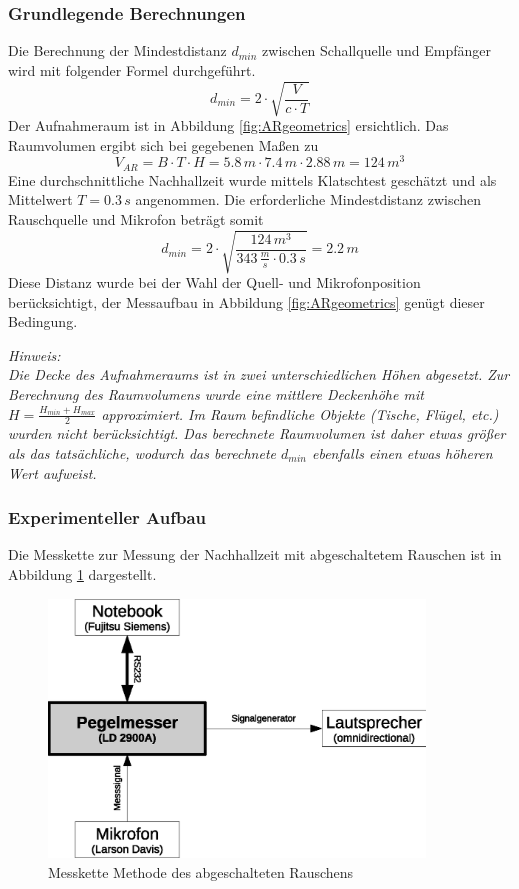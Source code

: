 \documentclass[11pt]{report}
\begin{document}
\subsubsection{Grundlegende Berechnungen}
Die Berechnung der Mindestdistanz $d_{min}$ zwischen Schallquelle und Empf\"anger wird mit folgender Formel durchgef\"uhrt.
\begin{equation}
d_{min}=2\cdot \sqrt{\frac{V}{c\cdot T}}
\label{eq:dmin}
\end{equation}
Der Aufnahmeraum ist in Abbildung \ref{fig:ARgeometrics} ersichtlich. Das Raumvolumen ergibt sich bei gegebenen Ma\ss en zu 
\begin{equation}
V_{AR} = B\cdot T\cdot H = 5.8\,m\cdot 7.4\,m\cdot 2.88\,m = 124\,m^{3}
\end{equation}
Eine durchschnittliche Nachhallzeit wurde mittels Klatschtest gesch\"atzt und als Mittelwert $T=0.3\,s$ angenommen. Die erforderliche Mindestdistanz zwischen Rauschquelle und Mikrofon betr\"agt somit
\begin{equation}
d_{min}=2\cdot \sqrt{\frac{124\,m^{3}}{343\,\frac{m}{s}\cdot 0.3\,s}} = 2.2\,m
\end{equation}
Diese Distanz wurde bei der Wahl der Quell- und Mikrofonposition ber\"ucksichtigt, der Messaufbau in Abbildung \ref{fig:ARgeometrics} gen\"ugt dieser Bedingung.
\begin{leftbar}
\textit{ Hinweis:\\
Die Decke des Aufnahmeraums ist in zwei unterschiedlichen H\"ohen abgesetzt. Zur Berechnung des Raumvolumens wurde eine mittlere Deckenh\"ohe mit $H=\frac{H_{min}+H_{max}}{2}$ approximiert. Im Raum befindliche Objekte (Tische, Fl\"ugel, etc.) wurden nicht ber\"ucksichtigt. Das berechnete Raumvolumen ist daher etwas gr\"o\ss er als das tats\"achliche, wodurch das berechnete $d_{min}$ ebenfalls einen etwas h\"oheren Wert aufweist.} 
\end{leftbar}
\subsubsection{Experimenteller Aufbau}
Die Messkette zur Messung der Nachhallzeit mit abgeschaltetem Rauschen ist in Abbildung \ref{fig:rauschaufbau} dargestellt.
\begin{figure}[htbp]
\begin{center}
\includegraphics[width=10cm,keepaspectratio=true]{rauschaufbau}
\caption{Messkette Methode des abgeschalteten Rauschens}
\label{fig:rauschaufbau}
\end{center}
\end{figure}
\end{document}
